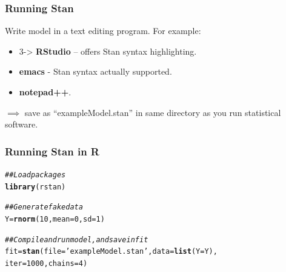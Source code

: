 \documentclass[handout]{beamer}
\makeatletter
\newcommand{\hlnum}[1]{\textcolor[rgb]{0.686,0.059,0.569}{#1}}%
\newcommand{\hlstr}[1]{\textcolor[rgb]{0.192,0.494,0.8}{#1}}%
\newcommand{\hlcom}[1]{\textcolor[rgb]{0.678,0.584,0.686}{\textit{#1}}}%
\newcommand{\hlstd}[1]{\textcolor[rgb]{0.345,0.345,0.345}{#1}}%
\newcommand{\hlkwb}[1]{\textcolor[rgb]{0.69,0.353,0.396}{#1}}%
\newcommand{\hlkwc}[1]{\textcolor[rgb]{0.333,0.667,0.333}{#1}}%
\newcommand{\hlkwd}[1]{\textcolor[rgb]{0.737,0.353,0.396}{\textbf{#1}}}%
\newenvironment{kframe}{%
	\def\at@end@of@kframe{}%
	\ifinner\ifhmode%
	\def\at@end@of@kframe{\end{minipage}}%
\begin{minipage}{\columnwidth}%
	\fi\fi%
	\def\FrameCommand##1{\hskip\@totalleftmargin \hskip-\fboxsep
		\colorbox{shadecolor}{##1}\hskip-\fboxsep
		\hskip-\linewidth \hskip-\@totalleftmargin \hskip\columnwidth}%
	\MakeFramed {\advance\hsize-\width
		\@totalleftmargin\z@ \linewidth\hsize
		\@setminipage}}%
{\par\unskip\endMakeFramed%
	\at@end@of@kframe}
\newenvironment{knitrout}{}{} %
\makeatother
\begin{document}
\begin{frame}
\frametitle{Running Stan}

 Write model in a text editing program. For example:
\begin{itemize}
\item 3-> \textbf{RStudio} -- offers Stan syntax highlighting.
\item<3-> \textbf{emacs} - Stan syntax actually supported.
\item<4-> \textbf{notepad++}.
\end{itemize}

 $\implies$ save as ``exampleModel.stan'' in same directory as you run statistical software.



\end{frame}

\begin{frame}[fragile]
	\frametitle{Running Stan in R}
	\begin{knitrout}\footnotesize
		\color{fgcolor}\begin{kframe}
			\begin{alltt}
				\hlcom{## Load packages}
				\hlkwd{library}\hlstd{(rstan)}
			\end{alltt}
\begin{alltt}
				\hlcom{## Generate fake data}
				\hlstd{Y} \hlkwb{=} \hlkwd{rnorm}\hlstd{(}\hlnum{10}\hlstd{,}\hlkwc{mean} \hlstd{=} \hlnum{0}\hlstd{,} \hlkwc{sd} \hlstd{=} \hlnum{1}\hlstd{)}
				
				\hlcom{## Compile and run model, and save in fit}
				\hlstd{fit} \hlkwb{=} \hlkwd{stan}\hlstd{(}\hlkwc{file}\hlstd{=}\hlstr{'exampleModel.stan'}\hlstd{,}\hlkwc{data}\hlstd{=}\hlkwd{list}\hlstd{(}\hlkwc{Y}\hlstd{=Y),}
				            \hlkwc{iter}\hlstd{=}\hlnum{1000}\hlstd{,}\hlkwc{chains}\hlstd{=}\hlnum{4}\hlstd{)}
			\end{alltt}
		\end{kframe}
	\end{knitrout}
\end{frame}
\end{document}
